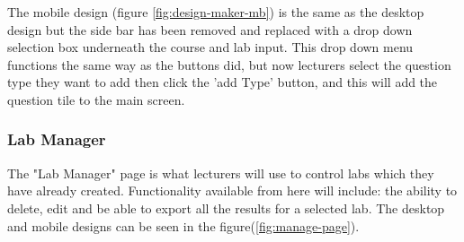 \documentclass[12pt]{article}  %
\begin{document}
The mobile design (figure \ref{fig:design-maker-mb}) is the same as the desktop design but the side bar has been removed and replaced with a drop down selection box underneath the course and lab input. This drop down menu functions the same way as the buttons did, but now lecturers select the question type they want to add then click the 'add Type' button, and this will add the question tile to the main screen.


\subsubsection{Lab Manager}
The "Lab Manager" page is what lecturers will use to control labs which they have already created. Functionality available from here will include: the ability to delete, edit and be able to export all the results for a selected lab. The desktop and mobile designs can be seen in the figure(\ref{fig:manage-page}). 
\end{document}
